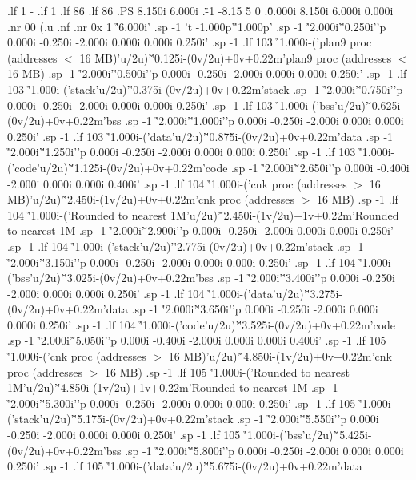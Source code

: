 .lf 1 -
.lf 1
.lf 86
.lf 86
.PS 8.150i 6.000i
.\" -1 -8.15 5 0
.\" 0.000i 8.150i 6.000i 0.000i
.nr 00 \n(.u
.nf
.nr 0x 1
\h'6.000i'
.sp -1
\D't -1.000p'\h'1.000p'
.sp -1
\h'2.000i'\v'0.250i'\D'p 0.000i -0.250i -2.000i 0.000i 0.000i 0.250i'
.sp -1
.lf 103
\h'1.000i-(\w'plan9 proc (addresses $<$ 16 MB)'u/2u)'\v'0.125i-(0v/2u)+0v+0.22m'plan9 proc (addresses $<$ 16 MB)
.sp -1
\h'2.000i'\v'0.500i'\D'p 0.000i -0.250i -2.000i 0.000i 0.000i 0.250i'
.sp -1
.lf 103
\h'1.000i-(\w'stack'u/2u)'\v'0.375i-(0v/2u)+0v+0.22m'stack
.sp -1
\h'2.000i'\v'0.750i'\D'p 0.000i -0.250i -2.000i 0.000i 0.000i 0.250i'
.sp -1
.lf 103
\h'1.000i-(\w'bss'u/2u)'\v'0.625i-(0v/2u)+0v+0.22m'bss
.sp -1
\h'2.000i'\v'1.000i'\D'p 0.000i -0.250i -2.000i 0.000i 0.000i 0.250i'
.sp -1
.lf 103
\h'1.000i-(\w'data'u/2u)'\v'0.875i-(0v/2u)+0v+0.22m'data
.sp -1
\h'2.000i'\v'1.250i'\D'p 0.000i -0.250i -2.000i 0.000i 0.000i 0.250i'
.sp -1
.lf 103
\h'1.000i-(\w'code'u/2u)'\v'1.125i-(0v/2u)+0v+0.22m'code
.sp -1
\h'2.000i'\v'2.650i'\D'p 0.000i -0.400i -2.000i 0.000i 0.000i 0.400i'
.sp -1
.lf 104
\h'1.000i-(\w'cnk proc (addresses $>$ 16 MB)'u/2u)'\v'2.450i-(1v/2u)+0v+0.22m'cnk proc (addresses $>$ 16 MB)
.sp -1
.lf 104
\h'1.000i-(\w'Rounded to nearest 1M'u/2u)'\v'2.450i-(1v/2u)+1v+0.22m'Rounded to nearest 1M
.sp -1
\h'2.000i'\v'2.900i'\D'p 0.000i -0.250i -2.000i 0.000i 0.000i 0.250i'
.sp -1
.lf 104
\h'1.000i-(\w'stack'u/2u)'\v'2.775i-(0v/2u)+0v+0.22m'stack
.sp -1
\h'2.000i'\v'3.150i'\D'p 0.000i -0.250i -2.000i 0.000i 0.000i 0.250i'
.sp -1
.lf 104
\h'1.000i-(\w'bss'u/2u)'\v'3.025i-(0v/2u)+0v+0.22m'bss
.sp -1
\h'2.000i'\v'3.400i'\D'p 0.000i -0.250i -2.000i 0.000i 0.000i 0.250i'
.sp -1
.lf 104
\h'1.000i-(\w'data'u/2u)'\v'3.275i-(0v/2u)+0v+0.22m'data
.sp -1
\h'2.000i'\v'3.650i'\D'p 0.000i -0.250i -2.000i 0.000i 0.000i 0.250i'
.sp -1
.lf 104
\h'1.000i-(\w'code'u/2u)'\v'3.525i-(0v/2u)+0v+0.22m'code
.sp -1
\h'2.000i'\v'5.050i'\D'p 0.000i -0.400i -2.000i 0.000i 0.000i 0.400i'
.sp -1
.lf 105
\h'1.000i-(\w'cnk proc (addresses $>$ 16 MB)'u/2u)'\v'4.850i-(1v/2u)+0v+0.22m'cnk proc (addresses $>$ 16 MB)
.sp -1
.lf 105
\h'1.000i-(\w'Rounded to nearest 1M'u/2u)'\v'4.850i-(1v/2u)+1v+0.22m'Rounded to nearest 1M
.sp -1
\h'2.000i'\v'5.300i'\D'p 0.000i -0.250i -2.000i 0.000i 0.000i 0.250i'
.sp -1
.lf 105
\h'1.000i-(\w'stack'u/2u)'\v'5.175i-(0v/2u)+0v+0.22m'stack
.sp -1
\h'2.000i'\v'5.550i'\D'p 0.000i -0.250i -2.000i 0.000i 0.000i 0.250i'
.sp -1
.lf 105
\h'1.000i-(\w'bss'u/2u)'\v'5.425i-(0v/2u)+0v+0.22m'bss
.sp -1
\h'2.000i'\v'5.800i'\D'p 0.000i -0.250i -2.000i 0.000i 0.000i 0.250i'
.sp -1
.lf 105
\h'1.000i-(\w'data'u/2u)'\v'5.675i-(0v/2u)+0v+0.22m'data
